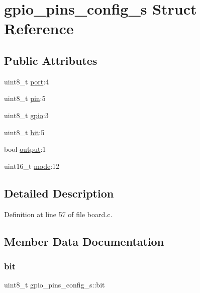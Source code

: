 \hypertarget{structgpio__pins__config__s}{}\section{gpio\+\_\+pins\+\_\+config\+\_\+s Struct Reference}
\label{structgpio__pins__config__s}
\subsection*{Public Attributes}
\begin{DoxyCompactItemize}
\item 
uint8\+\_\+t \hyperlink{structgpio__pins__config__s_a30e7e6f25a7dbb492bc4fd8d931b4469}{port}\+:4
\item 
uint8\+\_\+t \hyperlink{structgpio__pins__config__s_a945d4e973f65bd3ec160bc9bc88a91e4}{pin}\+:5
\item 
uint8\+\_\+t \hyperlink{structgpio__pins__config__s_af2a92d33ccdc6157dbeac136ec141816}{gpio}\+:3
\item 
uint8\+\_\+t \hyperlink{structgpio__pins__config__s_ab8df6c71a96c17514d470668c49229e8}{bit}\+:5
\item 
bool \hyperlink{structgpio__pins__config__s_a6b5dcac83020ad8521ada5478c5ac283}{output}\+:1
\item 
uint16\+\_\+t \hyperlink{structgpio__pins__config__s_a800021af92c51cd0c48d02fb15e834bf}{mode}\+:12
\end{DoxyCompactItemize}


\subsection{Detailed Description}


Definition at line 57 of file board.\+c.



\subsection{Member Data Documentation}
\mbox{\label{structgpio__pins__config__s_ab8df6c71a96c17514d470668c49229e8}} 
\subsubsection{\texorpdfstring{bit}{bit}}
{\footnotesize\ttfamily uint8\+\_\+t gpio\+\_\+pins\+\_\+config\+\_\+s\+::bit}



